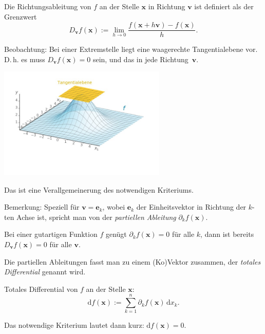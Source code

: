 \documentclass[9pt]{beamer}
\begin{document}
\begin{frame}
\begin{Definition}
Die Richtungsableitung von $f$ an der Stelle $\mathbf x$ in
Richtung $\mathbf v$ ist definiert als der Grenzwert
\[D_{\mathbf v} f(\mathbf x) := \lim_{h\to 0}\frac{f(\mathbf x+h\mathbf v)-f(\mathbf x)}{h}.\]
\end{Definition}
\end{frame}

\begin{frame}[t]
\vspace{3em}
Beobachtung: Bei einer Extremstelle liegt eine waagerechte
Tangentialebene vor. D.\,h. es muss $D_{\mathbf v} f(\mathbf x)=0$
sein, und das in jede Richtung~$\mathbf v$.\pause

\begin{center}
\includegraphics[width=80mm]{img/Maximum2.jpg}
\end{center}
\end{frame}

\begin{frame}
Das ist eine Verallgemeinerung des notwendigen Kriteriums.
\pause

\vspace{0.8em}
Bemerkung: Speziell für $\mathbf v = \mathbf e_k$, wobei
$\mathbf e_k$ der Einheitsvektor in Richtung der $k$-ten Achse ist,
spricht man von der \emph{partiellen Ableitung}
$\partial_k f(\mathbf x)$.
\pause

\vspace{0.8em}
Bei einer gutartigen Funktion $f$ genügt
$\partial_k f(\mathbf x)=0$ für alle $k$, dann ist bereits
$D_{\mathbf v}f(\mathbf x)=0$ für alle $\mathbf v$.
\end{frame}

\begin{frame}
Die partiellen Ableitungen fasst man zu einem (Ko)Vektor zusammen,
der \emph{totales Differential} genannt wird.\pause

\begin{Definition}
Totales Differential von $f$ an der Stelle $\mathbf x$:
\[\mathrm df(\mathbf x) := \sum_{k=1}^n \partial_k f(\mathbf x)\,\mathrm dx_k.\]
\end{Definition}
\pause

Das notwendige Kriterium lautet dann kurz: $\mathrm df(\mathbf x)=0$.
\end{frame}
\end{document}
